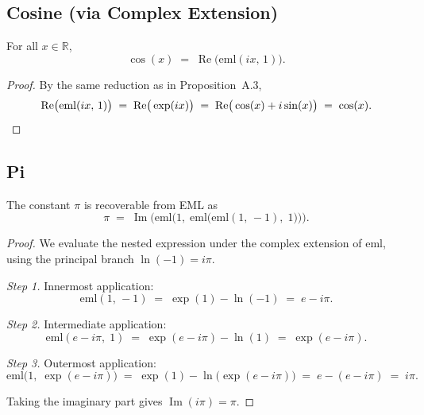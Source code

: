 \subsection{Cosine (via Complex Extension)}
\label{sec:proof-cos}

\begin{proposition}
For all $x \in \mathbb{R}$,
\[
    \cos(x) \;=\; \operatorname{Re}\!\big(\mathrm{eml}(ix,\, 1)\big).
\]
\end{proposition}

\begin{proof}
By the same reduction as in Proposition~A.3,
\[
    \operatorname{Re}\!\big(\mathrm{eml}(ix,\, 1)\big)
    \;=\; \operatorname{Re}\!\big(\exp(ix)\big)
    \;=\; \operatorname{Re}\!\big(\cos(x) + i\sin(x)\big)
    \;=\; \cos(x). \qedhere
\]
\end{proof}

\subsection{Pi}
\label{sec:proof-pi}

\begin{proposition}
The constant $\pi$ is recoverable from EML as
\[
    \pi \;=\; \operatorname{Im}\!\Big(\mathrm{eml}\!\Big(1,\;\mathrm{eml}\!\big(\mathrm{eml}(1,\, -1),\; 1\big)\Big)\Big).
\]
\end{proposition}

\begin{proof}
We evaluate the nested expression under the complex extension of $\mathrm{eml}$, using the principal branch $\ln(-1) = i\pi$.

\medskip
\noindent\textit{Step 1.}  Innermost application:
\[
    \mathrm{eml}(1,\, -1)
    \;=\; \exp(1) - \ln(-1)
    \;=\; e - i\pi.
\]

\noindent\textit{Step 2.}  Intermediate application:
\[
    \mathrm{eml}(e - i\pi,\; 1)
    \;=\; \exp(e - i\pi) - \ln(1)
    \;=\; \exp(e - i\pi).
\]

\noindent\textit{Step 3.}  Outermost application:
\[
    \mathrm{eml}\!\Big(1,\; \exp(e - i\pi)\Big)
    \;=\; \exp(1) - \ln\!\Big(\exp(e - i\pi)\Big)
    \;=\; e - (e - i\pi)
    \;=\; i\pi.
\]

Taking the imaginary part gives $\operatorname{Im}(i\pi) = \pi$.
\end{proof}

